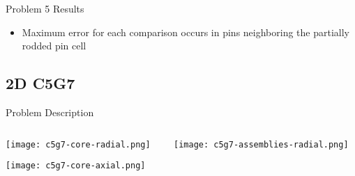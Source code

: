\begin{frame}[t]{Problem 5 Results}
    
    \begin{table}[h]
      \centering
    \end{table}
    \begin{itemize}
        \item Maximum error for each comparison occurs in pins neighboring the partially rodded pin cell
    \end{itemize}
    
\end{frame}


\subsection{2D C5G7}
\begin{frame}[t]{Problem Description}
 
\begin{columns}
\begin{column}{0.6\textwidth}
\vspace{-0.25in}
\begin{center}
\texttt{[image: c5g7-core-radial.png]}

\texttt{[image: c5g7-core-axial.png]}
\end{center}
\end{column}
\begin{column}{0.4\textwidth}
    \begin{center}
    \texttt{[image: c5g7-assemblies-radial.png]}
\end{center}
\end{column}
\end{columns}
    
\end{frame}

